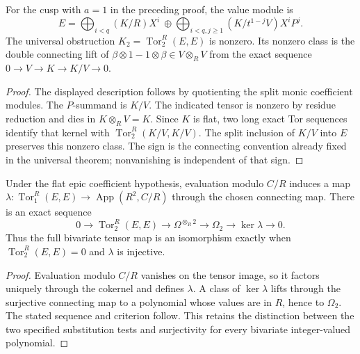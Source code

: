 \begin{corollary}\label{cor:flat-cusp-nonzero-tor-obstruction}
For the cusp with $a=1$ in the preceding proof, the value module is
\[
 E=\bigoplus_{i<q}(K/R)X^i\ \oplus\!
   \bigoplus_{i<q,j\ge1}(K/t^{1-j}V)X^iP^j.
\]
The universal obstruction $K_2=\operatorname{Tor}_2^R(E,E)$ is
nonzero. Its nonzero class is the double connecting lift of
$\beta\otimes1-1\otimes\beta\in V\otimes_RV$ from the exact
sequence $0\to V\to K\to K/V\to0$.
\end{corollary}
\begin{proof}
The displayed description follows by quotienting the split monic
coefficient modules. The $P$-summand is $K/V$. The indicated tensor
is nonzero by residue reduction and dies in $K\otimes_RV=K$.
Since $K$ is flat, two long exact Tor sequences identify that
kernel with $\operatorname{Tor}_2^R(K/V,K/V)$. The split inclusion
of $K/V$ into $E$ preserves this nonzero class. The sign is the
connecting convention already fixed in the universal theorem;
nonvanishing is independent of that sign.
\end{proof}

\begin{corollary}\label{cor:full-bivariate-flat-obstruction}
Under the flat epic coefficient hypothesis, evaluation modulo
$C/R$ induces a map
$\lambda:\operatorname{Tor}_1^R(E,E)\to\operatorname{App}(R^2,C/R)$
through the chosen connecting map. There is an exact sequence
\[
 0\to\operatorname{Tor}_2^R(E,E)\to\Omega^{\otimes_R2}
                \to\Omega_2\to\ker\lambda\to0.
\]
Thus the full bivariate tensor map is an isomorphism exactly when
$\operatorname{Tor}_2^R(E,E)=0$ and $\lambda$ is injective.
\end{corollary}
\begin{proof}
Evaluation modulo $C/R$ vanishes on the tensor image, so it factors
uniquely through the cokernel and defines $\lambda$. A class of
$\ker\lambda$ lifts through the surjective connecting map to a
polynomial whose values are in $R$, hence to $\Omega_2$.
The stated sequence and criterion follow. This retains the
distinction between the two specified substitution tests and
surjectivity for every bivariate integer-valued polynomial.
\end{proof}
